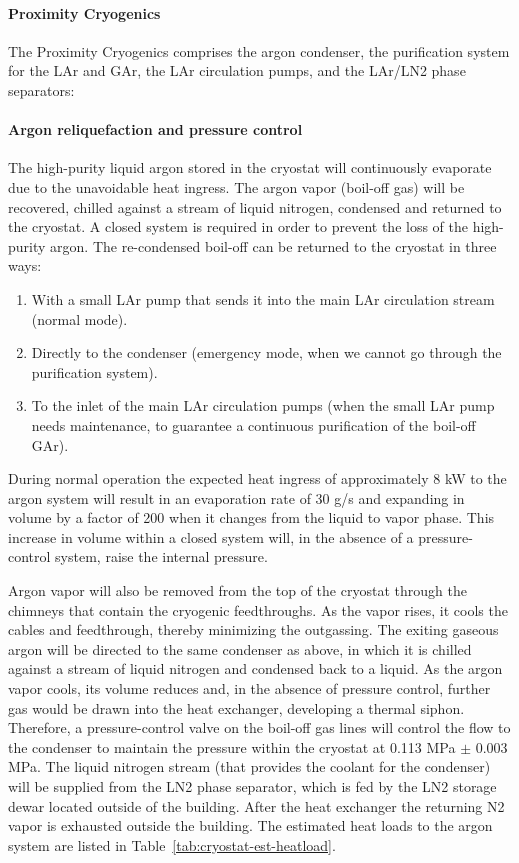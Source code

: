 \paragraph{Proximity Cryogenics}

The Proximity Cryogenics comprises the argon condenser, the purification system for the LAr and GAr, the LAr circulation pumps, and the LAr/LN2 phase separators:

\paragraph{Argon reliquefaction and pressure control}

The high-purity liquid argon stored in the cryostat will continuously evaporate due to the unavoidable heat ingress. The argon vapor (boil-off gas) will be recovered, chilled against a stream of liquid nitrogen, condensed and returned to the cryostat. A closed system is required in order to prevent the loss of the high-purity argon. The re-condensed boil-off can be returned to the cryostat in three ways:
\begin{enumerate}
\item With a small LAr pump that sends it into the main LAr circulation stream (normal mode).
\item Directly to the condenser (emergency mode, when we cannot go through the purification system).
\item To the inlet of the main LAr circulation pumps (when the small LAr pump needs maintenance, to guarantee a continuous purification of the boil-off GAr).
\end{enumerate}

During normal operation the expected heat ingress of approximately 8 kW to the argon system will result in an evaporation rate of 30 g/s and expanding in volume by a factor of 200 when it changes from the liquid to vapor phase. This increase in volume within a closed system will, in the absence of a pressure-control system, raise the internal pressure.

Argon vapor will also be removed from the top of the cryostat through the chimneys that contain the cryogenic feedthroughs. As the vapor rises, it cools the cables and feedthrough, thereby minimizing the outgassing. The exiting gaseous argon will be directed to the same condenser as above, in which it is chilled against a stream of liquid nitrogen and condensed back to a liquid. As the argon vapor cools, its volume reduces and, in the absence of pressure control, further gas would be drawn into the heat exchanger, developing a thermal siphon. Therefore, a pressure-control valve on the boil-off gas lines will control the flow to the condenser to maintain the pressure within the cryostat at 0.113 MPa $\pm$ 0.003 MPa. The liquid nitrogen stream (that provides the coolant for the condenser) will be supplied from the LN2 phase separator, which is fed by the LN2 storage dewar located outside of the building. After the heat exchanger the returning N2 vapor is exhausted outside the building. The estimated heat loads to the argon system are listed in Table~\ref{tab:cryostat-est-heatload}.

